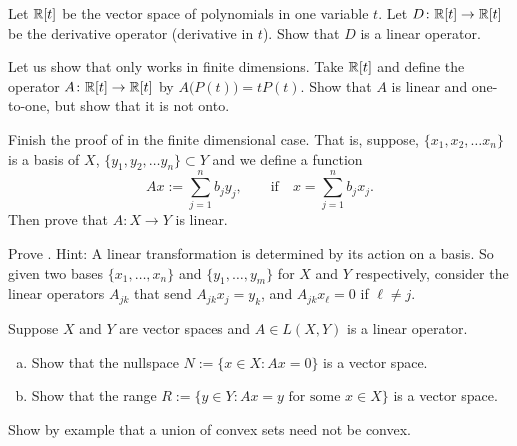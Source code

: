 \begin{exercise}
Let ${\mathbb{R}}[t]$ be the vector space of polynomials in one variable $t$.  Let
$D \colon {\mathbb{R}}[t] \to {\mathbb{R}}[t]$ be the derivative operator (derivative in $t$).
Show that $D$ is a linear operator.
\end{exercise}

\begin{exercise}
Let us show that  only works in finite
dimensions.  Take ${\mathbb{R}}[t]$ and define the operator $A \colon {\mathbb{R}}[t] \to {\mathbb{R}}[t]$
by $A\bigl(P(t)\bigr) = tP(t)$.  Show that $A$ is linear and one-to-one, but
show that it is not onto.
\end{exercise}

\begin{exercise}
Finish the proof of  in the finite dimensional case.
That is, suppose,
$\{ x_1, x_2,\ldots x_n \}$ is a basis of $X$,
$\{ y_1, y_2,\ldots y_n \} \subset Y$ and we define a
function
\begin{equation*}
Ax := \sum_{j=1}^n b_j y_j, \qquad \text{if} \quad x=\sum_{j=1}^n b_j x_j .
\end{equation*}
Then prove that $A \colon X \to Y$ is linear.
\end{exercise}


\begin{exercise}
Prove .  Hint: A linear transformation is determined by
its action on a basis.  So given two bases
$\{ x_1,\ldots,x_n \}$ and
$\{ y_1,\ldots,y_m \}$ for $X$ and $Y$ respectively, consider the linear
operators $A_{jk}$ that send $A_{jk} x_j = y_k$, and 
$A_{jk} x_\ell = 0$ if $\ell \not= j$.
\end{exercise}

\begin{samepage}
\begin{exercise}[Easy]
Suppose $X$ and $Y$ are vector spaces and $A \in L(X,Y)$ is a linear
operator.
\begin{enumerate}[a)]
\item
Show that the nullspace $N := \{ x \in X : Ax = 0 \}$ is a
vector space.
\item
Show that the range $R := \{ y \in Y : Ax = y \text{ for some $x \in X$} \}$ is a
vector space.
\end{enumerate}
\end{exercise}
\end{samepage}

\begin{exercise}[Easy]
Show by example that a union of convex sets need not be convex.
\end{exercise}

